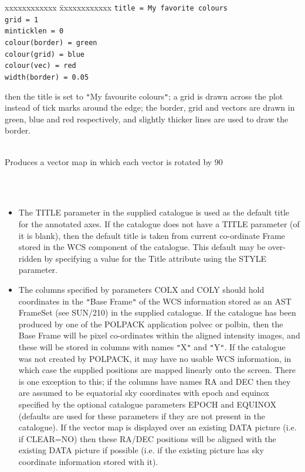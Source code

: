 \documentclass[twoside,11pt]{article}
\renewcommand{\_}{\texttt{\symbol{95}}}
\newlength{\sstexampleslength}
\newcommand{\sstexamplesubsection}[2]{\sloppy
\item[\parbox{\sstexampleslength}{\ssttt #1}] \mbox{} \vspace{1.0ex}
\\ #2 }
\newcommand{\sstnotes}[1]{\item[Notes:] \mbox{} \\[1.3ex] #1}
\newcommand{\sstitemlist}[1]{
  \mbox{} \\
  \vspace{-3.5ex}
  \begin{itemize}
     #1
  \end{itemize}
}
\newcommand{\sstitem}{\item}
\newcommand{\sstexamplesubsection}[2]{\item[{\ssttt #1}] #2}
\newcommand{\sstnotes}[1]{\item[Notes:] #1 }
\newcommand{\sstitemlist}[1]{
      \begin{itemize}
         #1
      \end{itemize}
      \\
   }
\newcommand{\sstitem}{\item}
\begin{document}
{{{\begin{tabbing}
 xxxxxxxxxxxx \= xxxxxxxxxxxx \kill
              \>  \texttt{title = My favorite colours} \\
              \>  \texttt{grid = 1} \\
              \>  \texttt{minticklen = 0} \\
              \>  \texttt{colour(border) = green} \\
              \>  \texttt{colour(grid) = blue} \\
              \>  \texttt{colour(vec) = red} \\
              \>  \texttt{width(border) = 0.05}
\end{tabbing}

         then the title is set to {\tt "}My favourite colours{\tt "}; a grid is drawn
         across the plot instead of tick marks around the edge; the border,
         grid and vectors are drawn in green, blue and red respectively,
         and slightly thicker lines are used to draw the border.
      }
      \sstexamplesubsection{
         polplot poltab ra dec noclear angrot=90 frame=eq(B1950)
      }{
         Produces a vector map in which each vector is rotated by 90
      }
   }
   \sstnotes{
      \sstitemlist{

         \sstitem
         The TITLE parameter in the supplied catalogue is used as the default
         title for the annotated axes. If the catalogue does not have a TITLE
         parameter (of it is blank), then the default title is taken from current
         co-ordinate Frame stored in the WCS component of the catalogue. This
         default may be over-ridden by specifying a value for the Title
         attribute using the STYLE parameter.

         \sstitem
         The columns specified by parameters COLX and COLY should hold
         coordinates in the {\tt "}Base Frame{\tt "} of the WCS information stored as
         an AST FrameSet (see SUN/210) in the supplied catalogue. If the
         catalogue has been produced by one of the POLPACK application polvec
         or polbin, then the Base Frame will be pixel co-ordinates within the
         aligned intensity images, and these will be stored in columns with
         names {\tt "}X{\tt "} and {\tt "}Y{\tt "}. If the catalogue was not created by POLPACK, it
         may have no usable WCS information, in which case the supplied
         positions are mapped linearly onto the screen. There is one
         exception to this; if the columns have names RA and DEC then they
         are assumed to be equatorial sky coordinates with epoch and equinox
         specified by the optional catalogue parameters EPOCH and EQUINOX
         (defaults are used for these parameters if they are not present in the
         catalogue). If the vector map is displayed over an existing DATA
         picture (i.e. if CLEAR=NO) then these RA/DEC positions will be aligned
         with the existing DATA picture if possible (i.e. if the existing
         picture has sky coordinate information stored with it).
      }
   }
}
\end{document}
